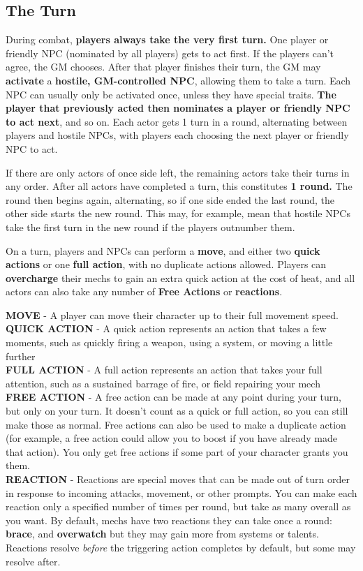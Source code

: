 \subsection{The Turn}
During combat, \textbf{players always take the very first turn.} One player or friendly NPC (nominated by all players) gets to act first. If the players can't agree, the GM chooses. After that player finishes their turn, the GM may \textbf{activate} a \textbf{hostile, GM-controlled NPC}, allowing them to take a turn. Each NPC can usually only be activated once, unless they have special traits. \textbf{The player that previously acted then nominates a player or friendly NPC to act next}, and so on. Each actor gets 1 turn in a round, alternating between players and hostile NPCs, with players each choosing the next player or friendly NPC to act.

If there are only actors of once side left, the remaining actors take their turns in any order. After all actors have completed a turn, this constitutes \textbf{1 round.} The round then begins again, alternating, so if one side ended the last round, the other side starts the new round. This may, for example, mean that hostile NPCs take the first turn in the new round if the players outnumber them.

On a turn, players and NPCs can perform a \textbf{move}, and either two \textbf{quick actions} or one \textbf{full action}, with no duplicate actions allowed. Players can \textbf{overcharge} their mechs to gain an extra quick action at the cost of heat, and all actors can also take any number of \textbf{Free Actions} or \textbf{reactions}.

\textbf{MOVE} - A player can move their character up to their full movement speed.\\
\textbf{QUICK ACTION} - A quick action represents an action that takes a few moments, such as quickly firing a weapon, using a system, or moving a little further\\
\textbf{FULL ACTION} - A full action represents an action that takes your full attention, such as a sustained barrage of fire, or field repairing your mech\\
\textbf{FREE ACTION} - A free action can be made at any point during your turn, but only on your turn. It doesn't count as a quick or full action, so you can still make those as normal. Free actions can also be used to make a duplicate action (for example, a free action could allow you to boost if you have already made that action). You only get free actions if some part of your character grants you them.\\
\textbf{REACTION} - Reactions are special moves that can be made out of turn order in response to incoming attacks, movement, or other prompts. You can make each reaction only a specified number of times per round, but take as many overall as you want. By default, mechs have two reactions they can take once a round: \textbf{brace}, and \textbf{overwatch} but they may gain more from systems or talents. Reactions resolve \textit{before} the triggering action completes by default, but some may resolve after.

